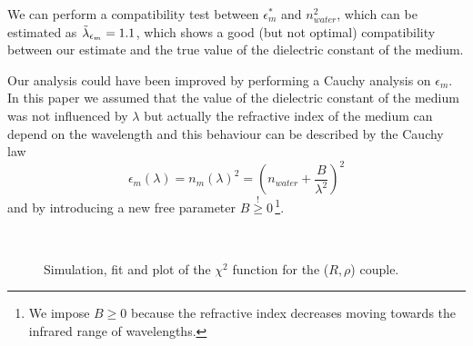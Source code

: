 \documentclass[twocolumn]{article}
\begin{document}
\begin{multicols}{2}
We can perform a compatibility test between $\epsilon_m^*$ and $n_{water}^2$, which can be estimated as $\Tilde{\lambda}_{\epsilon_m}=1.1$, which shows a good (but not optimal) compatibility between our estimate and the true value of the dielectric constant of the medium.

Our analysis could have been improved by performing a Cauchy analysis on $\epsilon_m$. In this paper we assumed that the value of the dielectric constant of the medium was not influenced by $\lambda$ but actually the refractive index of the medium can depend on the wavelength and this behaviour can be described by the Cauchy law
\begin{equation*}
\epsilon_{m}(\lambda)=n_{m}(\lambda)^{2}=\left(n_{water}+\frac{B}{\lambda^{2}}\right)^{2}
\end{equation*}
and by introducing a new free parameter $B\overset{!}{\geq} 0$\,\footnote{We impose $B\geq 0$ because the refractive index decreases moving towards the infrared range of wavelengths.}.


\end{multicols}
\newpage
\begin{figure}[H]
\centering
{} 
 \\
\caption{Simulation, fit and plot of the $\chi^2$ function for the ($R,\rho$) couple.}
\label{fig:r_rho}
\end{figure}
\end{document}
